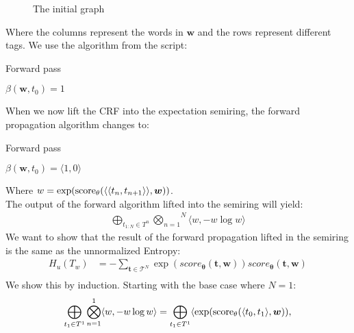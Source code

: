 \documentclass[a4paper,12pt]{ETHexercise}
\begin{document}
\begin{question}
\begin{subquestion}
\begin{figure}[H]
\begin{tikzpicture}[node distance={20mm}, thick, main/.style = {draw, circle}]
			\end{tikzpicture}
			\caption[]{The initial graph}
			\label{figure:graph}
		\end{figure}
		Where the columns represent the words in $\mathbf{w}$ and the rows represent different tags.
		We use the algorithm from the script:\\
		\begin{algorithm}[H]
			\SetAlgoLined
			\caption{Forward pass}
			\label{algorithm:forward}
			$\beta(\mathbf{w}, t_0) = 1$\\
		\end{algorithm}
		When we now lift the CRF into the expectation semiring, the forward propagation algorithm changes to:\\
		\begin{algorithm}[H]
			\SetAlgoLined
			\caption{Forward pass}
			\label{algorithm:forward_semi}
			$\beta(\mathbf{w}, t_0) = \langle 1, 0 \rangle$\\
		\end{algorithm}
		Where $w = \exp(\score{\langle t_n}{t_{n+1}\rangle})$.\\
		The output of the forward algorithm lifted into the semiring will yield:\\
		\begin{align}
			\bigoplus_{t_{1:N} \in T^{n}} \overset{N}{\bigotimes_{n=1}} \langle w, -w \log w \rangle
		\end{align}
		We want to show that the result of the forward propagation lifted in the semiring is the same as the unnormalized Entropy:
		\begin{align}
			H_u(T_{w}) & = -\sum_{\mathbf{t} \in \mathcal{T}^N} \exp(score_{\boldsymbol{\theta}} (\mathbf{t},\boldsymbol{w})) score_{\boldsymbol{\theta}} (\mathbf{t},\boldsymbol{w}) \\
		\end{align}
		We show this by induction. Starting with the base case where $N = 1$:\\
		\begin{align}
			\bigoplus_{t_{1} \in T^{1}} \overset{1}{\bigotimes_{n=1}} \langle w, -w \log w \rangle & = \bigoplus_{t_{1} \in T^{1}} \langle \exp(\score{t_0}{t_1}),                     \\

\end{align}
\end{subquestion}
\end{question}
\end{document}
